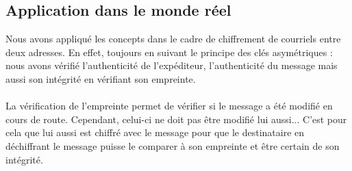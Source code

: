 \subsection{Application dans le monde réel}

Nous avons appliqué les concepts dans le cadre de chiffrement de courriels entre deux adresses. En effet, toujours en suivant le principe des clés asymétriques : nous avons vérifié l'authenticité de l'expéditeur, l'authenticité du message mais aussi son intégrité en vérifiant son empreinte.
\\ \\
La vérification de l'empreinte permet de vérifier si le message a été modifié en cours de route. Cependant, celui-ci ne doit pas être modifié lui aussi... C'est pour cela que lui aussi est chiffré avec le message pour que le destinataire en déchiffrant le message puisse le comparer à son empreinte et être certain de son intégrité.

